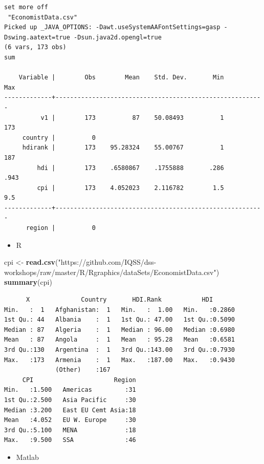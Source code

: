 \documentclass[]{book}
\newenvironment{Shaded}{\begin{snugshade}}{\end{snugshade}}
\newcommand{\KeywordTok}[1]{\textcolor[rgb]{0.13,0.29,0.53}{\textbf{#1}}}
\newcommand{\StringTok}[1]{\textcolor[rgb]{0.31,0.60,0.02}{#1}}
\newcommand{\NormalTok}[1]{#1}
\providecommand{\tightlist}{%
  \setlength{\itemsep}{0pt}\setlength{\parskip}{0pt}}
\begin{document}
\begin{verbatim}
set more off
 "EconomistData.csv"
Picked up _JAVA_OPTIONS: -Dawt.useSystemAAFontSettings=gasp -Dswing.aatext=true -Dsun.java2d.opengl=true
(6 vars, 173 obs)
sum

    Variable |        Obs        Mean    Std. Dev.       Min        Max
-------------+---------------------------------------------------------
          v1 |        173          87    50.08493          1        173
     country |          0
     hdirank |        173    95.28324    55.00767          1        187
         hdi |        173    .6580867    .1755888       .286       .943
         cpi |        173    4.052023    2.116782        1.5        9.5
-------------+---------------------------------------------------------
      region |          0
\end{verbatim}

\begin{itemize}
\tightlist
\item
  R
\end{itemize}

\begin{Shaded}
\begin{Highlighting}[]
\NormalTok{cpi <-}\StringTok{ }\KeywordTok{read.csv}\NormalTok{(}\StringTok{"https://github.com/IQSS/dss-workshops/raw/master/R/Rgraphics/dataSets/EconomistData.csv"}\NormalTok{)}
\KeywordTok{summary}\NormalTok{(cpi)}
\end{Highlighting}
\end{Shaded}

\begin{verbatim}
      X              Country       HDI.Rank           HDI        
Min.   :  1   Afghanistan:  1   Min.   :  1.00   Min.   :0.2860  
1st Qu.: 44   Albania    :  1   1st Qu.: 47.00   1st Qu.:0.5090  
Median : 87   Algeria    :  1   Median : 96.00   Median :0.6980  
Mean   : 87   Angola     :  1   Mean   : 95.28   Mean   :0.6581  
3rd Qu.:130   Argentina  :  1   3rd Qu.:143.00   3rd Qu.:0.7930  
Max.   :173   Armenia    :  1   Max.   :187.00   Max.   :0.9430  
              (Other)    :167                                    
     CPI                      Region  
Min.   :1.500   Americas         :31  
1st Qu.:2.500   Asia Pacific     :30  
Median :3.200   East EU Cemt Asia:18  
Mean   :4.052   EU W. Europe     :30  
3rd Qu.:5.100   MENA             :18  
Max.   :9.500   SSA              :46
\end{verbatim}

\begin{itemize}
\tightlist
\item
  Matlab
\end{itemize}
\end{document}
